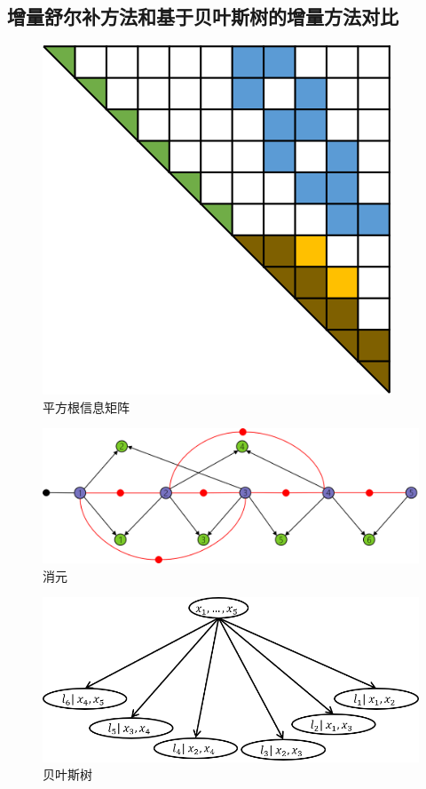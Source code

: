 \subsection{增量舒尔补方法和基于贝叶斯树的增量方法对比}

\begin{figure}[htb]
    \centering
    \includegraphics{figs/sqrt_info.png}
    \caption{平方根信息矩阵}
\end{figure}

\begin{figure}[htb]
    \centering
    \includegraphics[width=\textwidth]{figs/elim.png}
    \caption{消元}
\end{figure}

\begin{figure}[htb]
    \centering
    \includegraphics[width=\textwidth]{figs/bayes_tree.png}
    \caption{贝叶斯树}
\end{figure}
